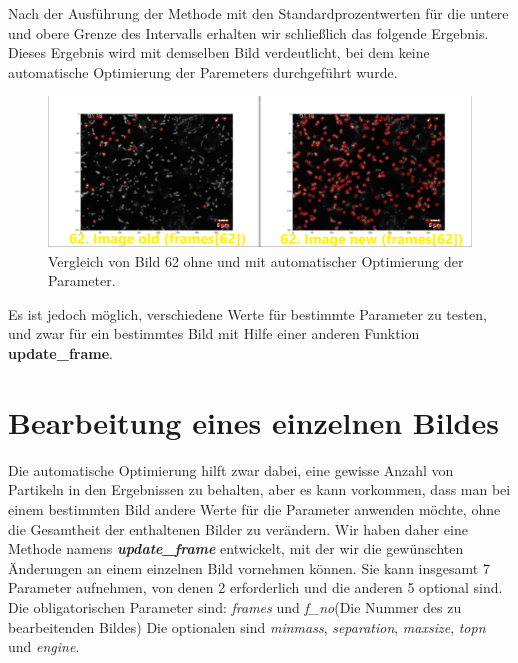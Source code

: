 Nach der Ausführung der Methode mit den Standardprozentwerten für die untere und obere Grenze des Intervalls erhalten wir schließlich das folgende Ergebnis. Dieses Ergebnis wird mit demselben Bild verdeutlicht, bei dem keine automatische Optimierung der Paremeters durchgeführt wurde.

\begin{figure}[H]
    \centering
    \includegraphics[scale=0.35]{Grafiken/trackpyBilder/comparison_62alt_Vs_62new.png}
    \caption{Vergleich von Bild 62 ohne und mit automatischer Optimierung der Parameter.}
    \label{fig:kap3_vergleich_Bild_62_mit_ohne}
\end{figure}
Es ist jedoch möglich, verschiedene Werte für bestimmte Parameter zu testen, und zwar für ein bestimmtes Bild mit Hilfe einer anderen Funktion \textbf{update\_frame}.

\section{Bearbeitung eines einzelnen Bildes \label{kap3_bearb_einz_bild}}
Die automatische Optimierung hilft zwar dabei, eine gewisse Anzahl von Partikeln in den Ergebnissen zu behalten, aber es kann vorkommen, dass man bei einem bestimmten Bild andere Werte für die Parameter anwenden möchte, ohne die Gesamtheit der enthaltenen Bilder zu verändern. 
Wir haben daher eine Methode namens \textit{\textbf{update\_frame}} entwickelt, mit der wir die gewünschten Änderungen an einem einzelnen Bild vornehmen können.
Sie kann insgesamt 7 Parameter aufnehmen, von denen 2 erforderlich und die anderen 5 optional sind. Die obligatorischen Parameter sind: \textit{frames} und \textit{f\_no}(Die Nummer des zu bearbeitenden Bildes)
Die optionalen sind \textit{minmass}, \textit{separation}, \textit{maxsize}, \textit{topn} und \textit{engine}.

